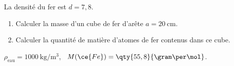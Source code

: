 La densité du fer est $d=7,8$.
\begin{enumerate}
    \item Calculer la masse d'un cube de fer d'arête $a=\qty{20}{\cm}$.
    \item Calculer la quantité de matière d'atomes de fer contenus dans ce cube.
\end{enumerate}

\begin{donnees}
    $\rho_{\text{eau}}=\qty{1000}{\kg\per\cubic\meter}$, \
    $M(\ce{Fe})=\qty{55,8}{\gram\per\mol}$.
\end{donnees}
